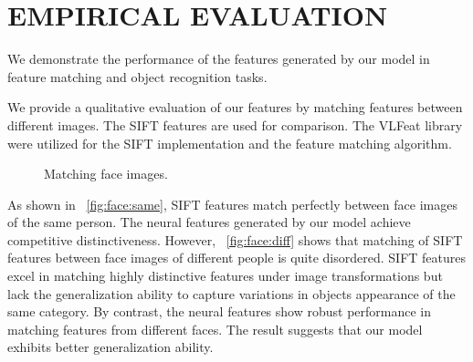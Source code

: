 \documentclass{ecai2014}
\begin{document}
\section{EMPIRICAL EVALUATION}\label{sec:exp}

We demonstrate the performance of the features generated by our model 
in feature matching and object recognition tasks.

We provide a qualitative evaluation of our features by matching features between different images.
The SIFT features are used for comparison.
The VLFeat library \cite{Vedaldi2008} were utilized for the SIFT implementation and the feature matching algorithm.

\begin{figure}[h]
\centering
\caption{Matching face images.}
\label{fig:facematch}
\end{figure}

As shown in \figurename~\ref{fig:face:same}, SIFT features match perfectly between face images of the same person.
The neural features generated by our model achieve competitive distinctiveness.
However, \figurename~\ref{fig:face:diff} shows that 
matching of SIFT features between face images of different people is quite disordered.
SIFT features excel in matching highly distinctive features under image transformations 
but lack the generalization ability to capture variations in objects appearance of the same category.
By contrast, the neural features show robust performance in matching features from different faces.
The result suggests that our model exhibits better generalization ability.
\end{document}
